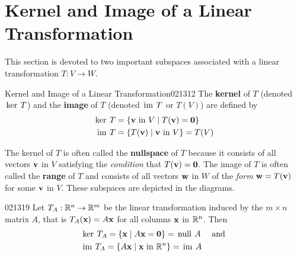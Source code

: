 \section{Kernel and Image of a Linear Transformation}
\label{sec:7_2}

This section is devoted to two important subspaces associated with a linear transformation $T : V \to W$.


\begin{definition}{Kernel and Image of a Linear Transformation}{021312}
The \textbf{kernel} of $T$ (denoted $\thinspace\operatorname{ker \medspace}T$) and the \textbf{image} of $T$ (denoted $\thinspace\operatorname{im \medspace}T$ or $T(V)$) are defined by
\begin{align*}
\thinspace\operatorname{ker \medspace}T &= \{\textbf{v} \mbox{ in } V \mid T(\textbf{v}) = \textbf{0}\} \\
\thinspace\operatorname{im \medspace}T &= \{T(\textbf{v}) \mid \textbf{v} \mbox{ in } V\} = T(V)
\end{align*} 
\end{definition}

\begin{wrapfigure}[6]{l}{5cm}
	\centering
	
\end{wrapfigure}

\noindent The kernel of $T$ is often called the \textbf{nullspace} of $T$ because it consists of all vectors $\textbf{v}$ in $V$ satisfying the \textit{condition} that $T(\textbf{v}) = \textbf{0}$. The image of $T$ is often called the \textbf{range} of $T$ and consists of all vectors $\textbf{w}$ in $W$ of the \textit{form} $\textbf{w} = T(\textbf{v})$ for some $\textbf{v}$ in $V$. These subspaces are depicted in the diagrams.

\vspace*{-1em}
\hfill
\begin{example}{}{021319}
Let $T_{A} : \mathbb{R}^n \to \mathbb{R}^m$ be the linear transformation induced by the $m \times n$ matrix $A$, that is $T_{A}(\textbf{x}) = A\textbf{x}$ for all columns $\textbf{x}$ in $\mathbb{R}^n$. Then
\begin{align*}
&\thinspace\operatorname{ker \medspace}T_{A} = \{\textbf{x} \mid A\textbf{x} = \textbf{0}\} = \thinspace\operatorname{null \medspace}A \quad \mbox{ and } \\
&\thinspace\operatorname{im \medspace}T_{A} = \{A\textbf{x} \mid \textbf{x} \mbox{ in } \mathbb{R}^n\} = \thinspace\operatorname{im \medspace}A
\end{align*}
\end{example}

